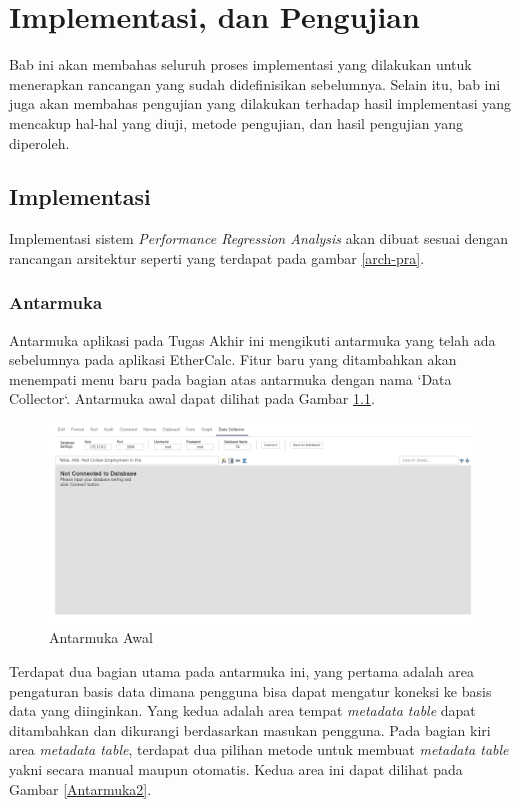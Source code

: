 \chapter{Implementasi, dan Pengujian}

Bab ini akan membahas seluruh proses implementasi yang dilakukan untuk menerapkan rancangan yang sudah didefinisikan sebelumnya. Selain itu, bab ini juga akan membahas pengujian yang dilakukan terhadap hasil implementasi yang mencakup hal-hal yang diuji, metode pengujian, dan hasil pengujian yang diperoleh. 


\section{Implementasi}
Implementasi sistem \textit{Performance Regression Analysis} akan dibuat sesuai dengan rancangan arsitektur seperti yang terdapat pada gambar \ref{arch-pra}. 

\subsection{Antarmuka}
Antarmuka aplikasi pada Tugas Akhir ini mengikuti antarmuka yang telah ada sebelumnya pada aplikasi EtherCalc. Fitur baru yang ditambahkan akan menempati menu baru pada bagian atas antarmuka dengan nama `Data Collector`. Antarmuka awal dapat dilihat pada Gambar \ref{Antarmuka1}.

\begin{figure}[htb]
	\centering
	\includegraphics[width=1.0\textwidth]{resources/chapter-4-interface-1.png}
	\caption{Antarmuka Awal}
	\label{Antarmuka1}
\end{figure}

Terdapat dua bagian utama pada antarmuka ini, yang pertama adalah area pengaturan basis data dimana pengguna bisa dapat mengatur koneksi ke basis data yang diinginkan. Yang kedua adalah area tempat \textit{metadata table} dapat ditambahkan dan dikurangi berdasarkan masukan pengguna. Pada bagian kiri area \textit{metadata table}, terdapat dua pilihan metode untuk membuat \textit{metadata table} yakni secara manual maupun otomatis. Kedua area ini dapat dilihat pada Gambar \ref{Antarmuka2}.

